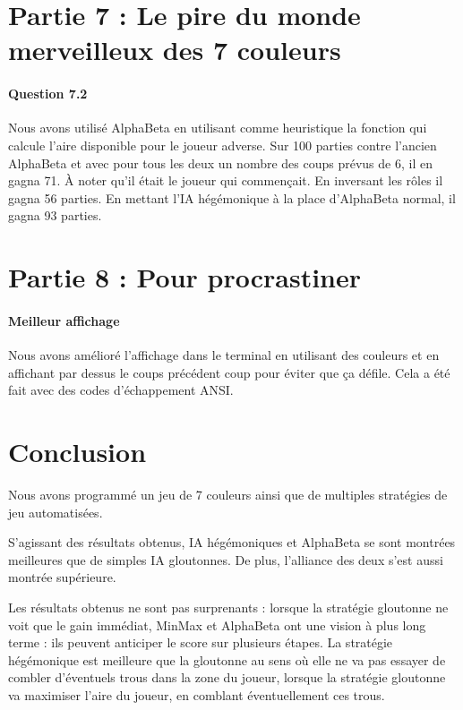 \documentclass[a4paper]{article}
\begin{document}
    \section{Partie 7 : Le pire du monde merveilleux des 7 couleurs}
    \paragraph{Question 7.2} Nous avons utilisé AlphaBeta en utilisant comme
    heuristique la fonction qui calcule l'aire disponible pour le joueur
    adverse. Sur 100 parties contre l'ancien AlphaBeta et avec pour tous les
    deux un nombre des coups prévus de 6, il en gagna 71. À noter qu'il était
    le joueur qui commençait. En inversant les rôles il gagna 56 parties.
    En mettant l'IA hégémonique à la place d'AlphaBeta normal, il gagna 93
    parties.


    \section{Partie 8 : Pour procrastiner}
    \paragraph{Meilleur affichage} Nous avons amélioré l'affichage dans le
    terminal en utilisant des couleurs et en affichant par dessus le coups
    précédent coup pour éviter que ça défile. Cela a été fait avec des codes
    d'échappement ANSI.

    \section{Conclusion}
    Nous avons programmé un jeu de 7 couleurs ainsi que de multiples stratégies 
de jeu automatisées. 
    
    S'agissant des résultats obtenus, IA hégémoniques et AlphaBeta 
se sont montrées meilleures que de simples IA gloutonnes. De plus, l'alliance 
des deux s'est aussi montrée supérieure.

Les résultats obtenus ne sont pas surprenants : lorsque la stratégie gloutonne 
ne voit que le gain immédiat, MinMax et AlphaBeta ont une vision à plus long 
terme : ils peuvent anticiper le score sur plusieurs étapes. La stratégie 
hégémonique est meilleure que la gloutonne au sens où elle ne va pas essayer de 
combler d'éventuels trous dans la zone du joueur, lorsque la stratégie 
gloutonne va maximiser l'aire du joueur, en comblant éventuellement ces trous.
\end{document}
